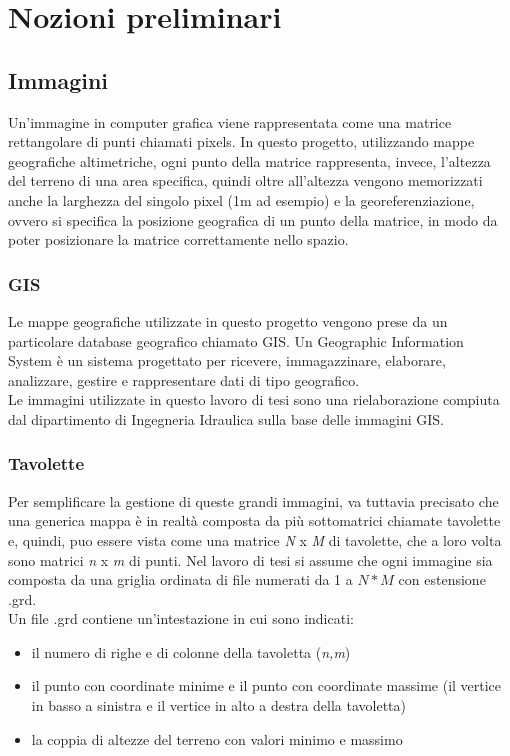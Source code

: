 \chapter{Nozioni preliminari}

\section{Immagini}

	Un'immagine in computer grafica viene rappresentata come una matrice rettangolare di punti chiamati pixels. 
	In questo progetto, utilizzando mappe geografiche altimetriche, ogni punto della matrice rappresenta, invece, l'altezza del terreno di una area specifica, quindi oltre all'altezza vengono memorizzati anche la larghezza del singolo pixel (1m ad esempio) e la georeferenziazione, ovvero si specifica la posizione geografica di un punto della matrice, in modo da poter posizionare la matrice correttamente nello spazio. 

	\subsection{GIS}
		Le mappe geografiche utilizzate in questo progetto vengono prese da un particolare database geografico chiamato GIS. Un Geographic Information System \`{e} un sistema progettato per ricevere, immagazzinare, elaborare, analizzare, gestire e rappresentare dati di tipo geografico. \\ 
		Le immagini utilizzate in questo lavoro di tesi sono una rielaborazione compiuta dal dipartimento di Ingegneria Idraulica sulla base delle immagini GIS.
	\subsection{Tavolette}
		Per semplificare la gestione di queste grandi immagini, va tuttavia precisato che una generica mappa \`{e} in realt\`{a} composta da pi\`{u} sottomatrici chiamate tavolette e, quindi, puo essere vista come una matrice \textit{N} x \textit{M} di tavolette, che a loro volta sono matrici \textit{n} x \textit{m} di punti.
	    Nel lavoro di tesi si assume che ogni immagine sia composta da una griglia ordinata di file numerati da 1 a $N*M$ con estensione .grd.\\
		Un file .grd contiene un'intestazione in cui sono indicati: 
		\begin{itemize}
			\item il numero di righe e di colonne della tavoletta (\textit{n,m})
			\item il punto con coordinate minime e il punto con coordinate massime (il vertice in basso a sinistra e il vertice in alto a destra della tavoletta) 
			\item la coppia di altezze del terreno con valori minimo e massimo
		\end{itemize}

